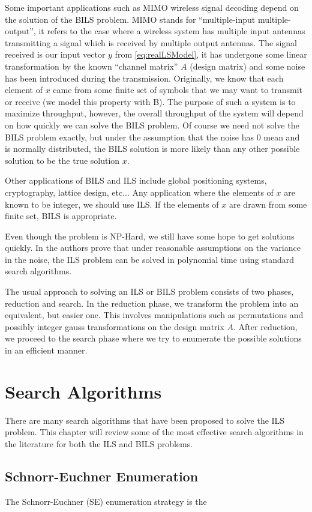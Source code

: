 \documentclass[12pt,Bold,letterpaper]{mcgilletdclass}
\newcommand{\boxcon}{{\cal B}}
\begin{document}
Some important applications such as MIMO wireless signal decoding depend on the
solution of the BILS problem. MIMO stands for ``multiple-input
multiple-output'', it refers to the case where a wireless system has multiple
input antennas transmitting a signal which is received by multiple output
antennas. The signal received is our input vector $y$ from
\eqref{eq:realLSModel}, it has undergone some linear transformation by the known
``channel matrix'' $A$ (design matrix) and some noise has been introduced during
the transmission. Originally, we know that each element of $x$ came from some
finite set of symbols that we may want to transmit or receive (we model
this property with \boxcon). The purpose of such a system is to maximize
throughput, however, the overall throughput of the system will depend on how
quickly we can solve the BILS problem. Of course we need not solve the BILS
problem exactly, but under the assumption that the noise has $0$ mean and is
normally distributed, the BILS solution is more likely than any other possible
solution to be the true solution $x$.

Other applications of BILS and ILS include global positioning systems,
cryptography, lattice design, etc... Any application where the elements of $x$
are known to be integer, we should use ILS. If the elements of $x$ are drawn
from some finite set, BILS is appropriate.

Even though the problem is NP-Hard, we still have some hope to get solutions
quickly. In \cite{HasV05} the authors prove that under reasonable assumptions
on the variance in the noise, the ILS problem can be solved in polynomial time
using standard search algorithms.

The usual approach to solving an ILS or BILS problem consists of two phases,
reduction and search. In the reduction phase, we transform the problem into an
equivalent, but easier one. This involves manipulations such as permutations
and possibly integer gauss transformations on the design matrix $A$. After
reduction, we proceed to the search phase where we try to enumerate the possible
solutions in an efficient manner.

\chapter{Search Algorithms}
There are many search algorithms that have been proposed to solve the ILS
problem. This chapter will review some of the most effective search algorithms
in the literature for both the ILS and BILS problems.

\section{Schnorr-Euchner Enumeration}
The Schnorr-Euchner (SE) enumeration strategy is the 





\end{document}
